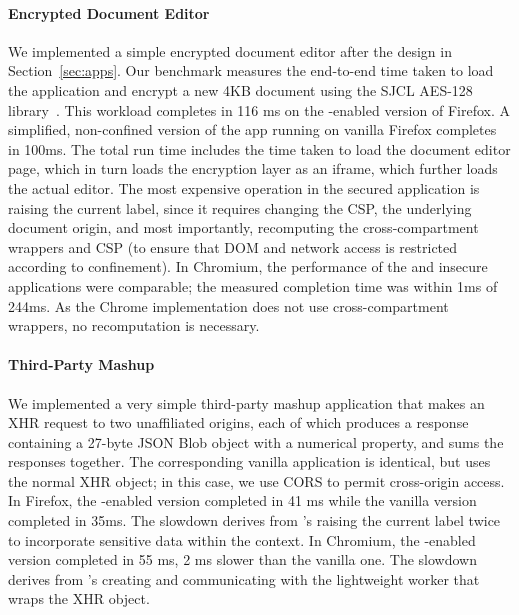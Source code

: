 \paragraph{Encrypted Document Editor}

We implemented a simple encrypted document editor after the
design in Section~\ref{sec:apps}.
%
Our benchmark measures the end-to-end time taken to load the
application and encrypt a new 4KB document using
the SJCL AES-128 library~\cite{sjcl}.
%
This workload completes in 116 ms on the \sys{}-enabled
version of Firefox. A simplified, non-confined version of the app
running on vanilla Firefox completes in 100ms.
%
The total run time includes the time taken to load the document editor
page, which in turn loads the encryption layer as an iframe, which
further loads the actual editor.
%
The most expensive operation in the secured application is raising the
current label, since it requires changing the CSP, the underlying
document origin, and most importantly, recomputing the
cross-compartment wrappers and CSP (to ensure that DOM and network
access is restricted according to confinement).
%
In Chromium, the performance of the \sys{} and insecure applications
were comparable; the measured completion time was within 1ms of 244ms.
%
As the Chrome implementation does not use cross-compartment
wrappers, no recomputation is necessary.


\paragraph{Third-Party Mashup}

We implemented a very simple third-party mashup application that makes
an XHR request to two unaffiliated origins, each of which produces a
response containing a 27-byte JSON Blob object with a numerical
property, and sums the responses together.
%
The corresponding vanilla application is identical, but uses the
normal XHR object; in this case, we use CORS to permit cross-origin
access.
%
In Firefox, the \sys{}-enabled version completed in 41 ms while the
vanilla version completed in 35ms. The slowdown derives from \sys{}'s
raising the current label twice to incorporate sensitive data within
the context.
%
In Chromium, the \sys{}-enabled version completed in 55 ms, 2 ms
slower than the vanilla one. The slowdown derives from \sys{}'s
creating and communicating with the lightweight worker that wraps the
XHR object.

